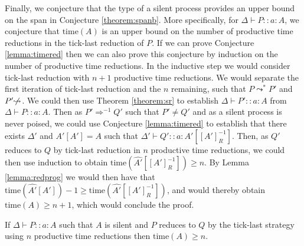 Finally, we conjecture that the type of a silent process provides an upper bound on the span in Conjecture \ref{theorem:spanb}. More specifically, for $\Delta\vdash P :: a\!:\!A$, we conjecture that $\text{time}(A)$ is an upper bound on the number of productive time reductions in the tick-last reduction of $P$. If we can prove Conjecture \ref{lemma:timered} then we can also prove this conjecture by induction on the number of productive time reductions. In the inductive step we would consider tick-last reduction with $n+1$ productive time reductions. We would separate the first iteration of tick-last reduction and the $n$ remaining, such that $P\leadsto^* P'$ and $P'\!\not\!\leadsto$. We could then use Theorem \ref{theorem:sr} to establish $\Delta\vdash P' :: a\!:\!A$ from $\Delta\vdash P :: a\!:\!A$. Then as $P'\Longrightarrow^{-1} Q'$ such that $P'\neq Q'$ and as a silent process is never poised, we could use Conjecture \ref{lemma:timered} to establish that there exists $\Delta'$ and $\hat{A'}[A']=A$ such that $\Delta'\vdash Q' :: a\!:\!\hat{A'}[[A']^{-1}_R]$. Then, as $Q'$ reduces to $Q$ by tick-last reduction in $n$ productive time reductions, we could then use induction to obtain $\text{time}(\hat{A'}[[A']^{-1}_R])\geq n$. By Lemma \ref{lemma:redprog} we would then have that $\text{time}(\hat{A'}[A'])-1\geq \text{time}(\hat{A'}[[A']^{-1}_R])$, and would thereby obtain $\text{time}(A)\geq n + 1$, which would conclude the proof.

\begin{conj}\label{theorem:spanb}
If $\Delta\vdash P :: a\!:\!A$ such that $A$ is silent and $P$ reduces to $Q$ by the tick-last strategy using $n$ productive time reductions then $\text{time}(A) \geq n$.
\end{conj}

